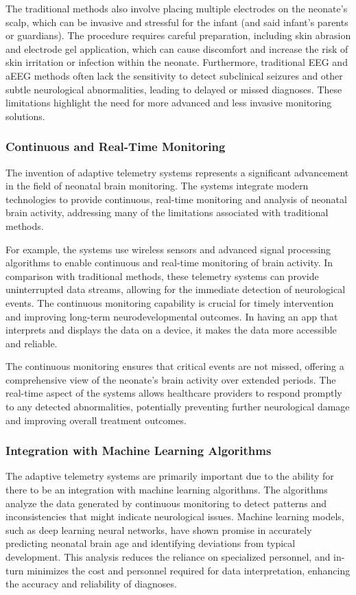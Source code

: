 \documentclass[12pt,journal,compsoc]{IEEEtran}
\begin{document}
The traditional methods also involve placing multiple electrodes on the neonate's scalp, which can be invasive and stressful for the infant (and said infant's parents or guardians). The procedure requires careful preparation, including skin abrasion and electrode gel application, which can cause discomfort and increase the risk of skin irritation or infection within the neonate. Furthermore, traditional EEG and aEEG methods often lack the sensitivity to detect subclinical seizures and other subtle neurological abnormalities, leading to delayed or missed diagnoses. These limitations highlight the need for more advanced and less invasive monitoring solutions.

\subsubsection{Continuous and Real-Time Monitoring}

The invention of adaptive telemetry systems represents a significant advancement in the field of neonatal brain monitoring. The systems integrate modern technologies to provide continuous, real-time monitoring and analysis of neonatal brain activity, addressing many of the limitations associated with traditional methods.

For example, the systems use wireless sensors and advanced signal processing algorithms to enable continuous and real-time monitoring of brain activity. In comparison with traditional methods, these telemetry systems can provide uninterrupted data streams, allowing for the immediate detection of neurological events. The continuous monitoring capability is crucial for timely intervention and improving long-term neurodevelopmental outcomes. In having an app that interprets and displays the data on a device, it makes the data more accessible and reliable.  

The continuous monitoring ensures that critical events are not missed, offering a comprehensive view of the neonate's brain activity over extended periods. The real-time aspect of the systems allows healthcare providers to respond promptly to any detected abnormalities, potentially preventing further neurological damage and improving overall treatment outcomes.

\subsubsection{Integration with Machine Learning Algorithms}

The adaptive telemetry systems are primarily important due to the ability for there to be an integration with machine learning algorithms. The algorithms analyze the data generated by continuous monitoring to detect patterns and inconsistencies that might indicate neurological issues. Machine learning models, such as deep learning neural networks, have shown promise in accurately predicting neonatal brain age and identifying deviations from typical development. This analysis reduces the reliance on specialized personnel, and in-turn minimizes the cost and personnel required for data interpretation, enhancing the accuracy and reliability of diagnoses.
\end{document}
